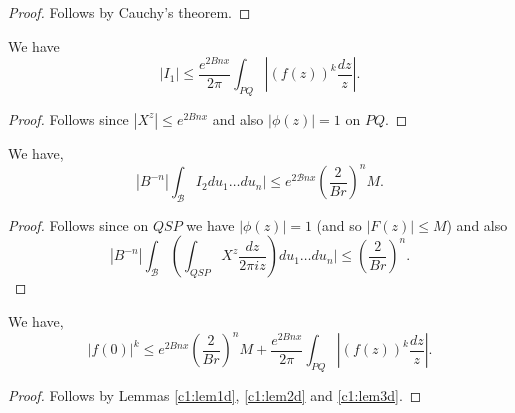 \begin{proof}
Follows by Cauchy's theorem.
\end{proof}

\begin{lem}\label{c1:lem2d}
We have
\begin{equation*}
|I_1| \leq \frac{e^{2Bnx}}{2\pi} \int_{PQ} |(f(z))^k \frac{dz}{z}|. \tag{1.7.9}\label{c1:eq1.7.9}
\end{equation*}
\end{lem}

\begin{proof}
Follows since $|X^z| \leq e^{2Bnx}$ and also $|\phi(z)| =1$ on $PQ$. 
\end{proof}

\begin{lem}\label{c1:lem3d}
We have,
\begin{equation*}
|B^{-n}| \int_{\mathcal{B}}  I_2 du_1 \ldots du_n | \leq e^{2 \mathcal{B} nx} \left(\frac{2}{Br} \right)^n M. \tag{1.7.10}\label{c1:eq1.7.10}
\end{equation*}
\end{lem}

\begin{proof}
Follows since on $QSP$ we have $|\phi (z)| =1$ (and so $|F(z)| \leq M$) and also
$$
|B^{-n}| \int_\mathcal{B} \left( \int_{QSP} X^z \frac{dz}{ 2 \pi i z}\right) du_1 \ldots du_n | \leq \left(\frac{2}{Br} \right)^n.
$$
\end{proof}

\begin{lem}\label{c1:lem4d}
We have,\pageoriginale
\begin{equation*}
|f(0)|^k \leq e^{2Bnx} \left(\frac{2}{Br} \right)^n M + \frac{e^{2Bnx}}{2\pi} \int_{PQ} |(f(z))^k \frac{dz}{z}| . \tag{1.7.11}\label{c1:eq1.7.11}
\end{equation*}
\end{lem}

\begin{proof}
Follows by Lemmas \ref{c1:lem1d}, \ref{c1:lem2d} and \ref{c1:lem3d}.
\end{proof}

